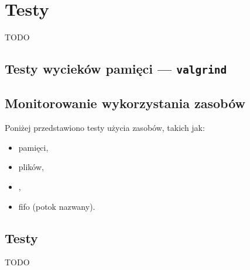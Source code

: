 \documentclass[thesis]{subfiles}
\begin{document}
\chapter{Testy}
\label{chapter:testy}

TODO

\section{Testy wycieków pamięci --- \texttt{valgrind}}

\section{Monitorowanie wykorzystania zasobów}

\noindent Poniżej przedstawiono testy użycia zasobów, takich jak:
\begin{itemize}
	\item pamięci,
	\item plików,
	\item {},
	\item \gls{fifo} (potok nazwany).
\end{itemize}

\section{Testy}

TODO
\end{document}
